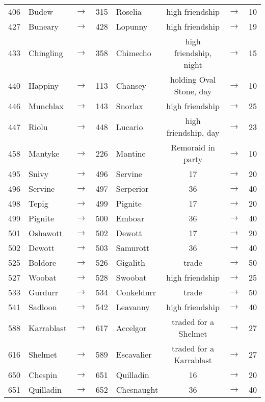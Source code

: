 \documentclass{article}
\begin{document}
\begin{longtable}{rlcrl|ccc}
406 & Budew & $\rightarrow$ & 315 & Roselia & high friendship & $\rightarrow$ & 10 \\
427 & Buneary & $\rightarrow$ & 428 & Lopunny & high friendship & $\rightarrow$ & 19 \\
433 & Chingling & $\rightarrow$ & 358 & Chimecho & high friendship, night & $\rightarrow$ & 15 \\
440 & Happiny & $\rightarrow$ & 113 & Chansey & holding Oval Stone, day & $\rightarrow$ & 10 \\
446 & Munchlax & $\rightarrow$ & 143 & Snorlax & high friendship & $\rightarrow$ & 25 \\
447 & Riolu & $\rightarrow$ & 448 & Lucario & high friendship, day & $\rightarrow$ & 23 \\
458 & Mantyke & $\rightarrow$ & 226 & Mantine & Remoraid in party & $\rightarrow$ & 10 \\
\hline %
495 & Snivy & $\rightarrow$ & 496 & Servine & 17 & $\rightarrow$ & 20 \\
496 & Servine & $\rightarrow$ & 497 & Serperior & 36 & $\rightarrow$ & 40 \\
498 & Tepig & $\rightarrow$ & 499 & Pignite & 17 & $\rightarrow$ & 20 \\
499 & Pignite & $\rightarrow$ & 500 & Emboar & 36 & $\rightarrow$ & 40 \\
501 & Oshawott & $\rightarrow$ & 502 & Dewott & 17 & $\rightarrow$ & 20 \\
502 & Dewott & $\rightarrow$ & 503 & Samurott & 36 & $\rightarrow$ & 40 \\
525 & Boldore & $\rightarrow$ & 526 & Gigalith & trade & $\rightarrow$ & 50 \\
527 & Woobat & $\rightarrow$ & 528 & Swoobat & high friendship & $\rightarrow$ & 25 \\
533 & Gurdurr & $\rightarrow$ & 534 & Conkeldurr & trade & $\rightarrow$ & 50 \\
541 & Sadloon & $\rightarrow$ & 542 & Leavanny & high friendship & $\rightarrow$ & 40 \\
588 & Karrablast & $\rightarrow$ & 617 & Accelgor & traded for a Shelmet & $\rightarrow$ & 27 \\
616 & Shelmet & $\rightarrow$ & 589 & Escavalier & traded for a Karrablast & $\rightarrow$ & 27 \\
\hline %
650 & Chespin & $\rightarrow$ & 651 & Quilladin & 16 & $\rightarrow$ & 20 \\
651 & Quilladin & $\rightarrow$ & 652 & Chesnaught & 36 & $\rightarrow$ & 40 \\

\end{longtable}
\end{document}
